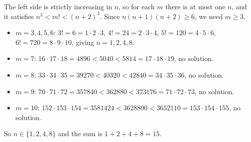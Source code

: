 The left side is strictly increasing in $n$, so for each $m$ there is at most one $n$, and it satisfies $n^3<m!<(n+2)^3$. Since $n(n+1)(n+2)\ge6$, we need $m\ge3$.
\begin{itemize}
\item $m=3,4,5,6$: $3!=6=1\cdot2\cdot3$, $4!=24=2\cdot3\cdot4$, $5!=120=4\cdot5\cdot6$, $6!=720=8\cdot9\cdot10$, giving $n=1,2,4,8$.
\item $m=7$: $16\cdot17\cdot18=4896<5040<5814=17\cdot18\cdot19$, no solution.
\item $m=8$: $33\cdot34\cdot35=39270<40320<42840=34\cdot35\cdot36$, no solution.
\item $m=9$: $70\cdot71\cdot72=357840<362880<373176=71\cdot72\cdot73$, no solution.
\item $m=10$: $152\cdot153\cdot154=3581424<3628800<3652110=153\cdot154\cdot155$, no solution.
\end{itemize}
So $n\in\{1,2,4,8\}$ and the sum is $1+2+4+8=\boxed{15}$.
